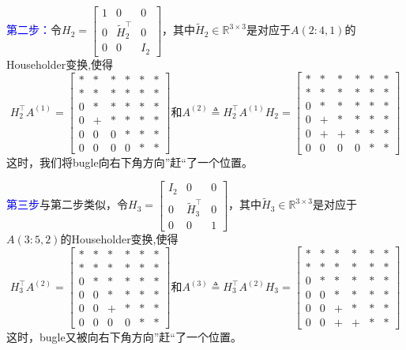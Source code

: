 \documentclass[12pt,a4paper]{article}
\begin{document}
\textcolor{blue}{第二步：}\quad 令$H_{2}=\left[\begin{array}{ccc}{1} & {0} & {0} \\ {0} & {\tilde{H}_{2}^{\top}} & {0} \\ {0} & {0} & {I_{2}}\end{array}\right]$，其中$\tilde{H}_{2} \in \mathbb{R}^{3 \times 3}$是对应于$A(2 : 4,1)$的Householder变换,使得$$
H_{2}^{\top} A^{(1)}=\left[\begin{array}{cccccc}{*} & {*} & {*}& {*}& {*}& {*} \\ {*} & {*} & {*} & {*}& {*}& {*}\\ {0} & {*} & {*} & {*} & {*}& {*}\\ {0} & {+} & {*} & {*}& {*}& {*}\\ {0} & {0} & {0} & {*}& {*}& {*}\\ {0} & {0} & {0} & {0}& {*}& {*}\end{array}\right]
\text{和}A^{(2)} \triangleq H_{2}^{\top} A^{(1)} H_{2}=\left[\begin{array}{cccccc}{*} & {*} & {*}& {*}& {*}& {*} \\ {*} & {*} & {*} & {*}& {*}& {*}\\ {0} & {*} & {*} & {*} & {*}& {*}\\ {0} & {+} & {*} & {*}& {*}& {*}\\ {0} & {+} & {+} & {*}& {*}& {*}\\ {0} & {0} & {0} & {0}& {*}& {*}\end{array}\right]
$$
这时，我们将bugle向右下角方向”赶“了一个位置。

\textcolor{blue}{第三步}\quad 与第二步类似，令$H_{3}=\left[\begin{array}{ccc}{I_2} & {0} & {0} \\ {0} & {\tilde{H}_{3}^{\top}} & {0} \\ {0} & {0} & {1}\end{array}\right]$，其中$\tilde{H}_{3} \in \mathbb{R}^{3 \times 3}$是对应于$A(3 : 5,2)$的Householder变换,使得$$
H_{3}^{\top} A^{(2)}=\left[\begin{array}{cccccc}{*} & {*} & {*}& {*}& {*}& {*} \\ {*} & {*} & {*} & {*}& {*}& {*}\\ {0} & {*} & {*} & {*} & {*}& {*}\\ {0} & {0} & {*} & {*}& {*}& {*}\\ {0} & {0} & {+} & {*}& {*}& {*}\\ {0} & {0} & {0} & {0}& {*}& {*}\end{array}\right]
\text{和}A^{(3)} \triangleq H_{3}^{\top} A^{(2)} H_{3}=\left[\begin{array}{cccccc}{*} & {*} & {*}& {*}& {*}& {*} \\ {*} & {*} & {*} & {*}& {*}& {*}\\ {0} & {*} & {*} & {*} & {*}& {*}\\ {0} & {0} & {*} & {*}& {*}& {*}\\ {0} & {0} & {+} & {*}& {*}& {*}\\ {0} & {0} & {+} & {+}& {*}& {*}\end{array}\right]
$$
这时，bugle又被向右下角方向”赶“了一个位置。
\end{document}
